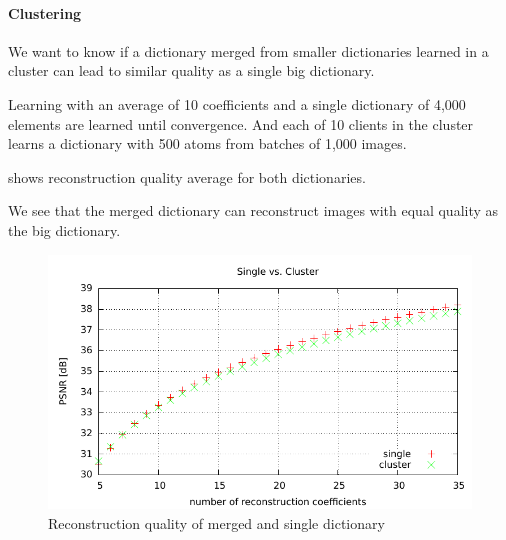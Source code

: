 


\paragraph{Clustering}
We want to know if a dictionary merged from smaller dictionaries learned in a
cluster can lead to similar quality as a single big dictionary.

Learning with an average of 10 coefficients and a single dictionary of 4,000
elements are learned until convergence. And each of 10 clients in the cluster
learns a dictionary with 500 atoms from batches of 1,000 images. 

 shows reconstruction quality average for both
dictionaries.

We see that the merged dictionary can reconstruct images with equal quality
as the big dictionary. 



\begin{figure}[H]
\centering
\includegraphics[width = 1.0\textwidth]{../tests/results/coeffsConvergInc.pdf}
\caption{Reconstruction quality of merged and single dictionary}
\label{fig:coeffsConvergInc}
\end{figure}


